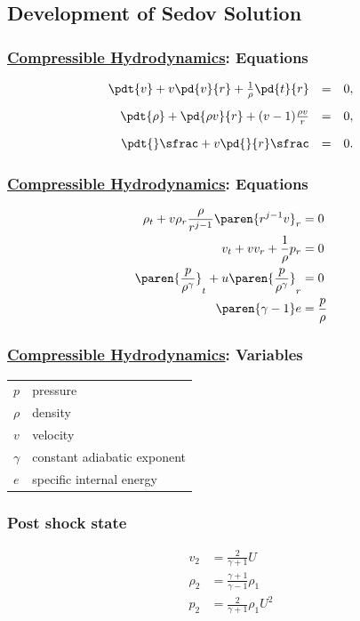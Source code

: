 \subsection{Development of Sedov Solution}
%
\begin{frame}\frametitle{\href{https://en.wikipedia.org/wiki/Compressible\_flow}{Compressible Hydrodynamics}: Equations}
\begin{equation}
\begin{array}{rcl}
	\pdt{v} + v \pd{v}{r} + \frac{1}{\rho}\pd{t}{r} &=& 0, \\[10pt]
	\pdt{\rho} + \pd{\rho v}{r} + (v-1) \frac{\rho v}{r} &=& 0, \\[10pt]
	\pdt{}\sfrac + v \pd{}{r} \sfrac &=& 0.
\label{eq:s1.3}
\end{array}
\end{equation}
\end{frame}
%
\begin{frame}\frametitle{\href{https://en.wikipedia.org/wiki/Compressible\_flow}{Compressible Hydrodynamics}: Equations}
\begin{align}
	\rho_{t} + v \rho_{r} \frac{\rho}{r^{j-1}} \paren{r^{j-1} v}_{r} &= 0 \\
	v_{t} + v v_{r} + \frac{1}{\rho} p_{r} &= 0 \\
	\paren{ \frac{p}{\rho^{\gamma}} }_{t} + u \paren{ \frac{p}{\rho^{\gamma}} }_{r} &= 0 \\
	\paren{ \gamma - 1} e &= \frac{p}{\rho}
\end{align}
\end{frame}
%
\begin{frame}\frametitle{\href{https://en.wikipedia.org/wiki/Compressible\_flow}{Compressible Hydrodynamics}: Variables}
\begin{table}[htp]
\begin{center}
	\begin{tabular}{ll}
		$p$ & pressure \\
		$\rho$ & density \\
		$v$ & velocity \\
		$\gamma$ & constant adiabatic exponent \\
		$e$ & specific internal energy 
	\end{tabular}
\end{center}
\end{table}%
\end{frame}
%
\begin{frame}\frametitle{Post shock state}
\center
\begin{equation}
\begin{array}{rl}
	v_{2} &= \displaystyle\frac{2}{\gamma + 1} U \\[15pt]
	\rho_{2} &= \displaystyle\frac{\gamma + 1}{\gamma - 1}\rho_{1} \\[15pt]
	p_{2} &= \displaystyle\frac{2}{\gamma + 1} \rho_{1} U^{2}
\end{array}
\label{eq:post-shock}
\end{equation}
\end{frame}
